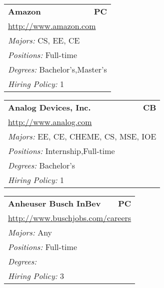 \documentclass[twoside]{article}
\begin{document}
\begin{center}
\begin{multicols}{3}
\begin{FlushLeft}
\begin{minipage}{\columnwidth}
\end{minipage}
 
\begin{minipage}{\columnwidth}\begin{tabularx}{.95\columnwidth}{Xr}
                 {\Large\bf Amazon} & {\Large\bf PC}\\
    \multicolumn{2}{p{.95\columnwidth}}{\url{http://www.amazon.com}}\\
    \multicolumn{2}{p{.95\columnwidth}}{\emph{Majors:} CS, EE, CE}\\
    \multicolumn{2}{p{.95\columnwidth}}{\emph{Positions:} Full-time}\\
    \multicolumn{2}{p{.95\columnwidth}}{\emph{Degrees:} Bachelor's,Master's}\\
    \multicolumn{2}{p{.95\columnwidth}}{\emph{Hiring Policy:} 1}\\
    \end{tabularx}
    
\end{minipage}
 
\begin{minipage}{\columnwidth}\begin{tabularx}{.95\columnwidth}{Xr}
                 {\Large\bf Analog Devices, Inc.} & {\Large\bf CB}\\
    \multicolumn{2}{p{.95\columnwidth}}{\url{http://www.analog.com}}\\
    \multicolumn{2}{p{.95\columnwidth}}{\emph{Majors:} EE, CE, CHEME, CS, MSE, IOE}\\
    \multicolumn{2}{p{.95\columnwidth}}{\emph{Positions:} Internship,Full-time}\\
    \multicolumn{2}{p{.95\columnwidth}}{\emph{Degrees:} Bachelor's}\\
    \multicolumn{2}{p{.95\columnwidth}}{\emph{Hiring Policy:} 1}\\
    \end{tabularx}
    
\end{minipage}
 
\begin{minipage}{\columnwidth}\begin{tabularx}{.95\columnwidth}{Xr}
                 {\Large\bf Anheuser Busch InBev} & {\Large\bf PC}\\
    \multicolumn{2}{p{.95\columnwidth}}{\url{http://www.buschjobs.com/careers}}\\
    \multicolumn{2}{p{.95\columnwidth}}{\emph{Majors:} Any}\\
    \multicolumn{2}{p{.95\columnwidth}}{\emph{Positions:} Full-time}\\
    \multicolumn{2}{p{.95\columnwidth}}{\emph{Degrees:} }\\
    \multicolumn{2}{p{.95\columnwidth}}{\emph{Hiring Policy:} 3}\\
    \end{tabularx}
    

\end{minipage}
\end{FlushLeft}
\end{multicols}
\end{center}
\end{document}
